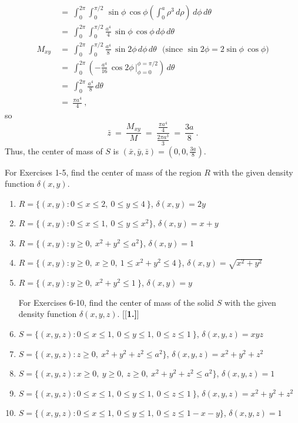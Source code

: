 \begin{exmp}
\begin{align*}
  &=~ \int_0^{2\pi} \int_0^{\pi /2} \,\sin \phi \,\cos \phi \left( \int_0^a \rho^3 \,d\rho \right) \,d\phi\,d\theta\\[8pt]
  &=~ \int_0^{2\pi} \int_0^{\pi /2} \tfrac{a^4}{4}\,\sin \phi\,\cos \phi\,d\phi\,d\theta\\[8pt]
  M_{xy} ~&=~ \int_0^{2\pi} \int_0^{\pi /2} \tfrac{a^4}{8}\,\sin 2\phi\,d\phi\,d\theta ~~~\text{(since $\sin 2\phi =
  2\sin \phi \, \cos \phi$)}\\[8pt]
  &=~ \int_0^{2\pi} \left(  -\tfrac{a^4}{16}\,\cos 2\phi\,\Big|_{\phi=0}^{\phi=\pi /2} \right) \,d\theta\\[8pt]
  &=~ \int_0^{2\pi} \tfrac{a^4}{8}\,d\theta\\
  &=~ \frac{\pi a^4}{4}~,
 \end{align*}
 so
 \begin{displaymath}
  \bar{z} ~=~ \frac{M_{xy}}{M} ~=~ \frac{\tfrac{\pi a^4}{4}}{\tfrac{2\pi a^3}{3}} ~=~ \frac{3a}{8} ~.
 \end{displaymath}
 Thus, the center of mass of $S$ is $(\bar{x},\bar{y},\bar{z}) = \left( 0,0,\frac{3a}{8} \right)$.
\end{exmp}
\startexercises\label{sec3dot6}
\par\noindent For Exercises 1-5, find the center of mass of the region $R$ with the given density function
$\delta(x,y)$.
\begin{enumerate}[\bfseries 1.]
 \item $R = \lbrace (x,y): 0 \le x \le 2,~ 0 \le y \le 4~ \rbrace$, $\delta(x,y) = 2y$
 \item $R = \lbrace (x,y): 0 \le x \le 1,~ 0 \le y \le x^2 \rbrace$, $\delta(x,y) = x+y$
 \item $R = \lbrace (x,y): y \ge 0, ~x^2 + y^2 \le a^2 \rbrace$, $\delta(x,y) = 1$
 \item $R = \lbrace (x,y): y \ge 0,~ x \ge 0, ~ 1 \le x^2 + y^2 \le 4~ \rbrace$, $\delta(x,y) = \sqrt{x^2 + y^2}$
 \item $R = \lbrace (x,y): y \ge 0, ~x^2 + y^2 \le 1~ \rbrace$, $\delta(x,y) = y$
\par\noindent For Exercises 6-10, find the center of mass of the solid $S$ with the given density function
$\delta(x,y,z)$.
[{[\bfseries 1.]}]
 \item $S = \lbrace (x,y,z): 0 \le x \le 1,~ 0 \le y \le 1,~ 0 \le z \le 1~ \rbrace$, $\delta(x,y,z) = xyz$
 \item $S = \lbrace (x,y,z): z \ge 0,~ x^2 + y^2 + z^2 \le a^2 \rbrace$, $\delta(x,y,z) = x^2 + y^2 + z^2$
 \item $S = \lbrace (x,y,z): x \ge 0,~ y \ge 0,~ z \ge 0, ~x^2 + y^2 + z^2 \le a^2 \rbrace$, $\delta(x,y,z) = 1$
 \item $S = \lbrace (x,y,z): 0 \le x \le 1,~ 0 \le y \le 1,~ 0 \le z \le 1~ \rbrace$, $\delta(x,y,z) = x^2 + y^2 + z^2$
 \item $S = \lbrace (x,y,z): 0 \le x \le 1,~ 0 \le y \le 1,~ 0 \le z \le 1 - x - y \rbrace$, $\delta(x,y,z) = 1$
\end{enumerate}
\newpage
